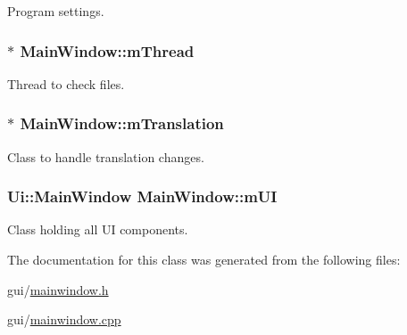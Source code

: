 Program settings. 

\hypertarget{class_main_window_a139aa6f8e80e8cef62a0eb72aa1c4071}{
\subsubsection[{m\-Thread}]{$\ast$ Main\-Window\-::m\-Thread\hspace{0.3cm}{\ttfamily [protected]}}}\label{class_main_window_a139aa6f8e80e8cef62a0eb72aa1c4071}


Thread to check files. 

\hypertarget{class_main_window_aba23fb4a828abca9434df9ce0e2419a7}{
\subsubsection[{m\-Translation}]{$\ast$ Main\-Window\-::m\-Translation\hspace{0.3cm}{\ttfamily [protected]}}}\label{class_main_window_aba23fb4a828abca9434df9ce0e2419a7}


Class to handle translation changes. 

\hypertarget{class_main_window_a03f313abfd5dc1ae549448b80093d480}{
\subsubsection[{m\-U\-I}]{\setlength{\rightskip}{0pt plus 5cm}Ui\-::\-Main\-Window Main\-Window\-::m\-U\-I\hspace{0.3cm}{\ttfamily [protected]}}}\label{class_main_window_a03f313abfd5dc1ae549448b80093d480}


Class holding all U\-I components. 



The documentation for this class was generated from the following files\-:\begin{DoxyCompactItemize}
\item 
gui/\hyperlink{mainwindow_8h}{mainwindow.\-h}\item 
gui/\hyperlink{mainwindow_8cpp}{mainwindow.\-cpp}\end{DoxyCompactItemize}
